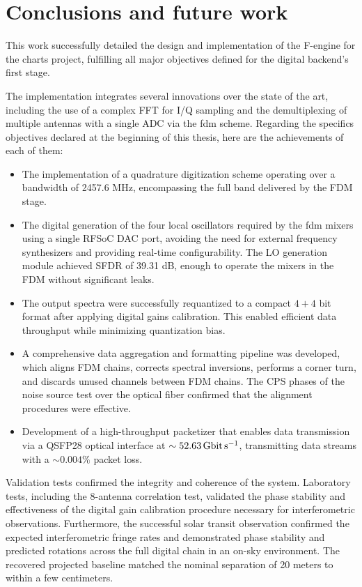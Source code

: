 \chapter{Conclusions and future work}
\label{ch:conclusions}
This work successfully detailed the design and implementation of the F-engine for the \gls{charts} project, fulfilling all major objectives defined for the digital backend’s first stage.

The implementation integrates several innovations over the state of the art, including the use of a complex FFT for I/Q sampling and the demultiplexing of multiple antennas with a single ADC via the \gls{fdm} scheme. Regarding the specifics objectives declared at the beginning of this thesis, here are the achievements of each of them:

\begin{itemize}
    \item The implementation of a quadrature digitization scheme operating over a bandwidth of 2457.6 MHz, encompassing the full band delivered by the FDM stage.
    \item The digital generation of the four local oscillators required by the \gls{fdm} mixers using a single RFSoC DAC port, avoiding the need for external frequency synthesizers and providing real-time configurability. The LO generation module achieved SFDR of 39.31 dB, enough to operate the mixers in the FDM without significant leaks.
    \item The output spectra were successfully requantized to a compact $4+4$ bit format after applying digital gains calibration. This enabled efficient data throughput while minimizing quantization bias.
    \item A comprehensive data aggregation and formatting pipeline was developed, which aligns FDM chains, corrects spectral inversions, performs a corner turn, and discards unused channels between FDM chains. The CPS phases of the noise source test over the optical fiber confirmed that the alignment procedures were effective.
    \item Development of a high-throughput packetizer that enables data transmission via a QSFP28 optical interface at $\sim\qty{52.63}{\giga\bit\per\second}$, transmitting data streams with a $\sim0.004\%$ packet loss.
\end{itemize}

Validation tests confirmed the integrity and coherence of the system. Laboratory tests, including the 8-antenna correlation test, validated the phase stability and effectiveness of the digital gain calibration procedure necessary for interferometric observations. Furthermore, the successful solar transit observation confirmed the expected interferometric fringe rates and demonstrated phase stability and predicted rotations across the full digital chain in an on-sky environment. The recovered projected baseline matched the nominal separation of 20 meters to within a few centimeters.

